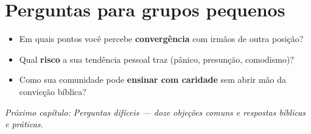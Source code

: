 \section{Perguntas para grupos pequenos}
\begin{itemize}[leftmargin=*,noitemsep]
  \item Em quais pontos você percebe \textbf{convergência} com irmãos de outra posição?
  \item Qual \textbf{risco} a sua tendência pessoal traz (pânico, presunção, comodismo)?
  \item Como sua comunidade pode \textbf{ensinar com caridade} sem abrir mão da convicção bíblica?
\end{itemize}

\bigskip
\noindent\textit{Próximo capítulo: Perguntas difíceis — doze objeções comuns e respostas bíblicas e práticas.}

